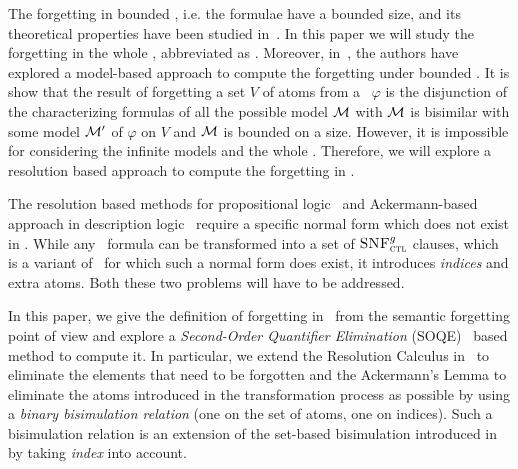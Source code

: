 \documentclass[letterpaper]{article} %
\begin{document}




The forgetting in bounded \CTL, i.e. the formulae have a bounded size, and  its theoretical properties have been studied in~\cite{renyansfirstpaper}. In this paper we will study the forgetting in the whole \CTL, abbreviated as \CTL. Moreover, in~\cite{renyansfirstpaper}, the authors have explored a model-based approach to compute the forgetting under bounded \CTL. It is show that the result of forgetting a set $V$ of atoms from a \CTL\ $\varphi$ is the disjunction of the characterizing formulas of all the possible model ${\cal M}$ with ${\cal M}$ is bisimilar with some model ${\cal M}'$ of $\varphi$ on $V$ and ${\cal M}$ is bounded on a size. However, it is impossible for considering the infinite models and the whole \CTL. Therefore, we will explore a resolution based approach to compute the forgetting in \CTL.


The resolution based methods for propositional logic~\cite{lin1994forget,Yisong:2015:arx} and Ackermann-based approach in description logic~\cite{Zhao:2017:IJCAI} require a specific normal form which does not exist in \CTL.
While any \CTL\ formula can be transformed into a set of ${\textsc{SNF}_{\textsc{ctl}}^g}$ clauses, which is a variant of \CTL\ for which such a normal form does exist, it introduces \emph{indices} and extra atoms. Both these two problems will have to be addressed.

In this paper, we give the definition of forgetting in \CTL\ from the semantic forgetting point of view and explore a \emph{Second-Order Quantifier Elimination} (SOQE)~\cite{gabbay2008second} based method to compute it. In particular, we extend the Resolution Calculus in~\cite{zhang2014resolution} to eliminate the elements that need to be forgotten and the Ackermann's Lemma to 
 eliminate the atoms introduced in the transformation process as possible %
by using a \emph{binary bisimulation relation} (one on the set of atoms, one on indices).
Such a bisimulation relation is an extension of the set-based bisimulation introduced in \cite{renyansfirstpaper} by taking \emph{index} into account.
\end{document}
